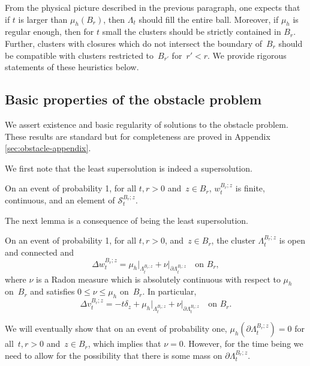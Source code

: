 \documentclass[12pt]{amsart}
\numberwithin{equation}{section}
\newcommand{\mclS}[2]{\hyperref[eq:super-solutions]{\mathcal{S}^{#1}_{#2}}}
\newcommand{\lss}[2]{\hyperref[eq:least-super-solution]{w^{#1}_{#2}}}
\newcommand{\cluster}[2]{\hyperref[eq:non-co-set]{\mathit{\Lambda}^{#1}_{#2}}}
\newcommand{\odometer}[2]{\hyperref[eq:limit-odometer]{v^{#1}_{#2}}}
\begin{document}
	From the physical picture described in the previous paragraph, one expects that if $t$ is larger than $\mu_h(B_r)$, then ${\cluster{}{t}}$ should fill the entire ball. Moreover, if $\mu_h$ is regular enough, then for $t$ small the clusters should be strictly contained in $B_r$. Further, clusters with closures which do not intersect the boundary of~$B_r$ should be compatible with clusters restricted to~$B_{r'}$ for~$r' < r$. We provide rigorous statements of these heuristics below. 
	
	
	
	\subsection{Basic properties of the obstacle problem} \label{subsec:basic-properties}
	We assert existence and basic regularity of solutions to the obstacle problem. These results are standard but for completeness
	are proved in Appendix \ref{sec:obstacle-appendix}. 
	
	
	
	We first note that the least supersolution is indeed a supersolution. 
	\begin{lemma}\label{lemma:basic-properties}
		On an event of probability 1, for all $t, r > 0$ and~$z \in B_r$, $\lss{B_r;z}{t}$ is finite, continuous, and an element of $\mclS{B_r;z}{t}$. 
	\end{lemma}
	
	
	The next lemma is a consequence of being the least supersolution. 
	\begin{lemma} \label{lemma:non-coincidence-open-harmonic}
		On an event of probability 1, for all $t,r > 0$, and~$z \in B_r$,  the cluster $\cluster{B_r;z}{t}$ is open and connected and
		\[
		\Delta \lss{B_r;z}{t} = \mu_h \vert_{\cluster{B_r;z}{t}} + \nu \vert_{\partial {\cluster{B_r;z}{t}}} \quad \mbox{on $B_r$},
		\]
		where $\nu$ is a Radon measure which is absolutely continuous with respect to $\mu_h$ on~$B_r$ and satisfies $0 \leq \nu \leq \mu_h$ on~$B_r$.
		In particular, 
		\[
		\Delta 	\odometer{B_r;z}{t} = -t \delta_z + \mu_h \vert_{{\cluster{B_r;z}{t}}} + \nu \vert_{\partial {\cluster{B_r;z}{t}}} \quad \mbox{on $B_r$}.
		\]
	\end{lemma}
	We will eventually show that on an event of probability one, $\mu_h(\partial {\cluster{B_r;z}{t}}) = 0$ for all~$t, r >0$ and~$z \in B_r$, which implies that $\nu = 0$. However, for the time being we need to allow for the possibility that there is some mass on $\partial {\cluster{B_r;z}{t}}$.
	
\end{document}

